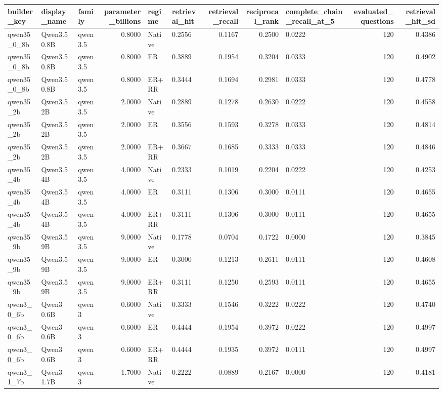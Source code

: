 \begin{tabular}{lllrllrrlrr}
\toprule
builder_key & display_name & family & parameter_billions & regime & retrieval_hit & retrieval_recall & reciprocal_rank & complete_chain_recall_at_5 & evaluated_questions & retrieval_hit_sd \\
\midrule
qwen35_0_8b & Qwen3.5 0.8B & qwen3.5 & 0.8000 & Native & 0.2556 & 0.1167 & 0.2500 & 0.0222 & 120 & 0.4386 \\
qwen35_0_8b & Qwen3.5 0.8B & qwen3.5 & 0.8000 & ER & 0.3889 & 0.1954 & 0.3204 & 0.0333 & 120 & 0.4902 \\
qwen35_0_8b & Qwen3.5 0.8B & qwen3.5 & 0.8000 & ER+RR & 0.3444 & 0.1694 & 0.2981 & 0.0333 & 120 & 0.4778 \\
qwen35_2b & Qwen3.5 2B & qwen3.5 & 2.0000 & Native & 0.2889 & 0.1278 & 0.2630 & 0.0222 & 120 & 0.4558 \\
qwen35_2b & Qwen3.5 2B & qwen3.5 & 2.0000 & ER & 0.3556 & 0.1593 & 0.3278 & 0.0333 & 120 & 0.4814 \\
qwen35_2b & Qwen3.5 2B & qwen3.5 & 2.0000 & ER+RR & 0.3667 & 0.1685 & 0.3333 & 0.0333 & 120 & 0.4846 \\
qwen35_4b & Qwen3.5 4B & qwen3.5 & 4.0000 & Native & 0.2333 & 0.1019 & 0.2204 & 0.0222 & 120 & 0.4253 \\
qwen35_4b & Qwen3.5 4B & qwen3.5 & 4.0000 & ER & 0.3111 & 0.1306 & 0.3000 & 0.0111 & 120 & 0.4655 \\
qwen35_4b & Qwen3.5 4B & qwen3.5 & 4.0000 & ER+RR & 0.3111 & 0.1306 & 0.3000 & 0.0111 & 120 & 0.4655 \\
qwen35_9b & Qwen3.5 9B & qwen3.5 & 9.0000 & Native & 0.1778 & 0.0704 & 0.1722 & 0.0000 & 120 & 0.3845 \\
qwen35_9b & Qwen3.5 9B & qwen3.5 & 9.0000 & ER & 0.3000 & 0.1213 & 0.2611 & 0.0111 & 120 & 0.4608 \\
qwen35_9b & Qwen3.5 9B & qwen3.5 & 9.0000 & ER+RR & 0.3111 & 0.1250 & 0.2593 & 0.0111 & 120 & 0.4655 \\
qwen3_0_6b & Qwen3 0.6B & qwen3 & 0.6000 & Native & 0.3333 & 0.1546 & 0.3222 & 0.0222 & 120 & 0.4740 \\
qwen3_0_6b & Qwen3 0.6B & qwen3 & 0.6000 & ER & 0.4444 & 0.1954 & 0.3972 & 0.0222 & 120 & 0.4997 \\
qwen3_0_6b & Qwen3 0.6B & qwen3 & 0.6000 & ER+RR & 0.4444 & 0.1935 & 0.3972 & 0.0111 & 120 & 0.4997 \\
qwen3_1_7b & Qwen3 1.7B & qwen3 & 1.7000 & Native & 0.2222 & 0.0889 & 0.2167 & 0.0000 & 120 & 0.4181 \\

\end{tabular}
